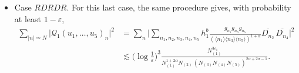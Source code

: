\documentclass[11pt, xcolor = dvipsnames,reqno
]{amsart}
\theoremstyle{definition}
\theoremstyle{remark}
\begin{document}
\begin{itemize}
\item Case $RDRDR$. For this last case, the same procedure gives, with probability at least $1-\varepsilon$, 
\begin{align}\label{eq:No_Pairings_ToBound_RDRDR}
    \sum_{|n| \simeq N}  \big| \mathcal{Q}_1(u_1, \ldots, u_5)_n \big|^2
    & = \sum_n 
    \Bigg| \sum_{n_1,n_2,n_3,n_4,n_5 } h^b_1 
    \frac{g_{n_1} g_{n_3} g_{n_5}}{ (\langle n_1 \rangle \langle n_3 \rangle\langle n_5 \rangle)^{1+\alpha}}\overline{D_{n_2}} \,  \overline{D_{n_4}}  \Bigg|^2 \\
    & \lesssim \Big(\log \frac{1}{\varepsilon} \Big)^3 \frac{N_{(1)}^{3\varepsilon_1}}{N_{(1)}^{1+2\alpha} N_{(2)}  \, (N_{(3)} N_{(4)} N_{(5)})^{2\alpha + 2\sigma - 1}}.
\end{align}
\end{itemize}
\end{document}
